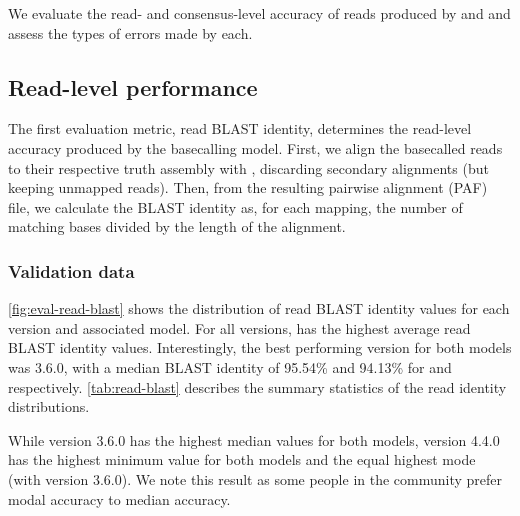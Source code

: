 We evaluate the read- and consensus-level accuracy of reads produced by \guppy{} and \tubby{} and assess the types of errors made by each. 

\subsection{Read-level performance}
\label{sec:tubby-read}

The first evaluation metric, read BLAST identity, determines the read-level accuracy produced by the basecalling model. First, we align the basecalled reads to their respective truth assembly with , discarding secondary alignments (but keeping unmapped reads). Then, from the resulting pairwise alignment (PAF) file, we calculate the BLAST identity as, for each mapping, the number of matching bases divided by the length of the alignment. 

\subsubsection{Validation data}

\autoref{fig:eval-read-blast} shows the distribution of read BLAST identity values for each \guppy{} version and associated \tubby{} model. For all versions, \tubby{} has the highest average read BLAST identity values. Interestingly, the best performing version for both models was 3.6.0, with a median BLAST identity of 95.54\% and 94.13\% for \tubby{} and \guppy{} respectively. \autoref{tab:read-blast} describes the summary statistics of the read identity distributions.

While version 3.6.0 has the highest median values for both models, version 4.4.0 has the highest minimum value for both models and the equal highest mode (with \tubby{} version 3.6.0). We note this result as some people in the \ont{} community prefer modal accuracy to median accuracy.

